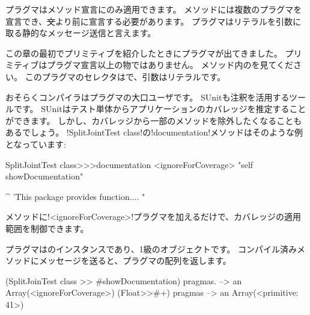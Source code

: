 \documentclass[a4paper,10pt,twoside]{book}
\begin{document}
プラグマはメソッド宣言にのみ適用できます。
メソッドには複数のプラグマを宣言でき、\st 文より前に宣言する必要があります。
プラグマはリテラルを引数に取る静的なメッセージ送信と言えます。

この章の最初でプリミティブを紹介したときにプラグマが出てきました。
プリミティブはプラグマ宣言以上の物ではありません。
メソッド内のを見てください。
このプラグマのセレクタはで、引数はリテラルです。

おそらくコンパイラはプラグマの大口ユーザです。
SUnitも注釈を活用するツールです。
SUnitはテスト単体からアプリケーションのカバレッジを推定することができます。
しかし、カバレッジから一部のメソッドを除外したくなることもあるでしょう。
\ct!SplitJointTest class!の\ct!documentation!メソッドはそのような例となっています:

\begin{code}{}
SplitJointTest class>>>documentation
	<ignoreForCoverage>
	"self showDocumentation"
	
	^ 'This package provides function.... "
\end{code}

メソッドに\ct!<ignoreForCoverage>!プラグマを加えるだけで、カバレッジの適用範囲を制御できます。


%	


プラグマはのインスタンスであり、1級のオブジェクトです。
コンパイル済みメソッドにメッセージを送ると、プラグマの配列を返します。

\begin{code}{}
(SplitJoinTest class >> #showDocumentation) pragmas.
  --> an Array(<ignoreForCoverage>)
(Float>>#+) pragmas --> an Array(<primitive: 41>)
\end{code}
\end{document}
